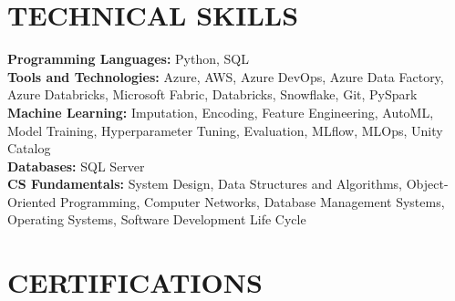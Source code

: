 \documentclass[letterpaper,11pt]{article}
\begin{document}
\section{\color{airforceblue}TECHNICAL SKILLS}
 \begin{itemize}[leftmargin=0in, label={}]
    \small{\item{
     \textbf{\normalsize{Programming Languages:}}{ \normalsize{Python, SQL}} \\
     \textbf{\normalsize{Tools and Technologies:}}{ \normalsize{Azure, AWS, Azure DevOps, Azure Data Factory, Azure Databricks, Microsoft Fabric, Databricks, Snowflake, Git, PySpark}} \\
     \textbf{\normalsize{Machine Learning:}}{ \normalsize{Imputation, Encoding, Feature Engineering, AutoML, Model Training, Hyperparameter Tuning, Evaluation, MLflow, MLOps, Unity Catalog}} \\
     \textbf{\normalsize{Databases:}}{ \normalsize{SQL Server}} \\
     \textbf{\normalsize{CS Fundamentals:}}{ \normalsize{System Design, Data Structures and Algorithms, Object-Oriented Programming, Computer Networks, Database Management Systems, Operating Systems, Software Development Life Cycle}} \\
     }}
 \end{itemize}
 \vspace{-12pt}




\section{\color{airforceblue}CERTIFICATIONS}
\end{document}
